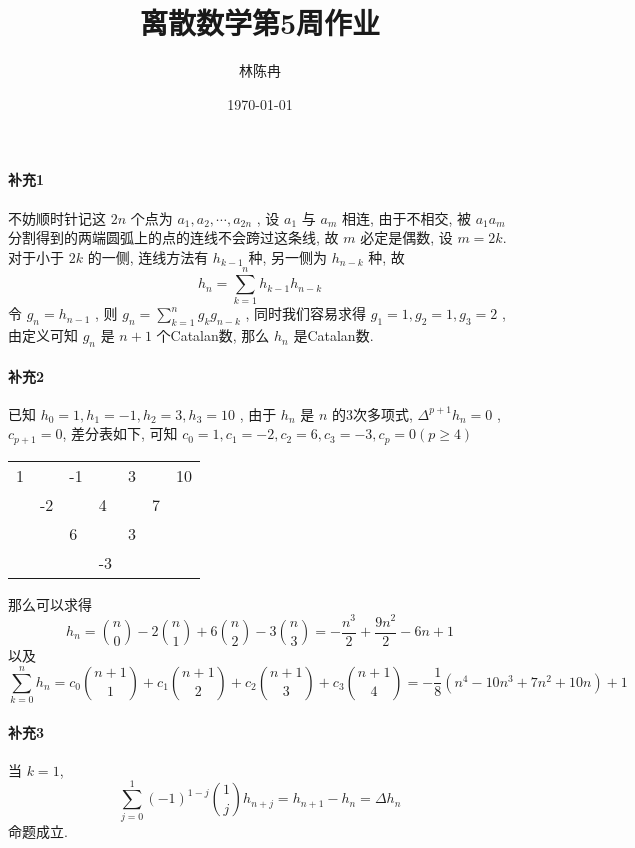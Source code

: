 \documentclass[a4paper, UTF8]{ctexart}				%
\title{离散数学第5周作业}
\author{林陈冉}
\date{\today}
\begin{document}
    \maketitle										%
    \paragraph{补充1}\quad 
        不妨顺时针记这 $2n$ 个点为 $a_1,a_2, \cdots, a_{2n}$ , 设 $a_1$ 与 $a_m$ 相连, 由于不相交, 被 $a_1a_m$ 分割得到的两端圆弧上的点的连线不会跨过这条线, 故 $m$ 必定是偶数, 设 $m=2k$. 对于小于 $2k$ 的一侧, 连线方法有 $h_{k-1}$ 种, 另一侧为 $h_{n-k}$ 种, 故
        \[
            h_n = \sum^{n}_{k=1}h_{k-1}h_{n-k}
        \]
        令 $g_n = h_{n-1}$ , 则 $g_n = \sum^{n}_{k=1}g_k  g_{n-k}$ , 同时我们容易求得 $g_1=1, g_2=1, g_3=2$ , 由定义可知 $g_n$ 是 $n+1$ 个Catalan数, 那么 $h_n$ 是Catalan数.
    \paragraph{补充2}\quad 
        已知 $h_0 = 1, h_1 = -1, h_2=3, h_3=10$ , 由于 $h_n$ 是 $n$ 的3次多项式, $\Delta^{p+1}h_n =0$ , $c_{p+1} = 0$, 差分表如下, 可知 $c_0 =1, c_1 =-2, c_2=6, c_3 = -3, c_p=0(p \ge 4)$
        \begin{table}[h]
        \centering
        \begin{tabular}{lllllll}
        1 &    & -1 &    & 3 &   & 10 \\
        & -2 &    & 4  &   & 7 &    \\
        &    & 6  &    & 3 &   &    \\
        &    &    & -3 &   &   &   
        \end{tabular}
        \end{table}

        那么可以求得 
        \[
            h_n = {{n} \choose {0}} - 2 {{n} \choose {1}} + 6 {{n} \choose {2}} -3 {{n} \choose {3}} = - \frac{n^3}{2} + \frac{9 n^2}{2} - 6n + 1
        \]
        以及
        \[
            \sum^{n}_{k=0}h_n = c_0 {{n+1} \choose {1}} + c_1 {{n+1} \choose {2}} + c_2 {{n+1} \choose {3}} + c_3 {{n+1} \choose {4}} = -\frac{1}{8} (n^4-10n^3+7n^2+10n) + 1
        \]
        
    \paragraph{补充3}\quad 
        当 $k=1$, 
        \[
            \sum^{1}_{j=0} (-1)^{1-j} {{1} \choose {j}} h_{n+j} = h_{n+1}-h_n = \Delta h_n
        \]
        命题成立.
\end{document}
